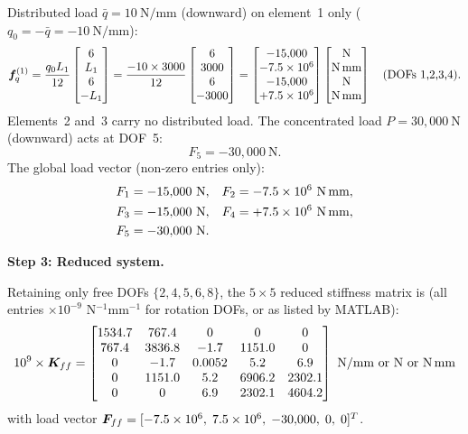 \begin{example}
Distributed load $\bar{q} = 10\ \text{N/mm}$ (downward) on element~1 only
($q_0 = -\bar{q} = -10\ \text{N/mm}$):
\begin{equation*}
    \bm{f}^{(1)}_q = \frac{q_0 L_1}{12}
    \begin{bmatrix} 6 \\ L_1 \\ 6 \\ -L_1 \end{bmatrix}
    = \frac{-10 \times 3000}{12}
    \begin{bmatrix} 6 \\ 3000 \\ 6 \\ -3000 \end{bmatrix}
    =
    \begin{bmatrix} -15{,}000 \\ -7.5 \times 10^6 \\ -15{,}000 \\ +7.5 \times 10^6
    \end{bmatrix}
    \begin{bmatrix} \text{N} \\ \text{N\,mm} \\ \text{N} \\ \text{N\,mm} \end{bmatrix}
    \quad\text{(DOFs 1,2,3,4)} .
\end{equation*}
Elements~2 and~3 carry no distributed load. The concentrated load
$P = 30{,}000\ \text{N}$ (downward) acts at DOF~5:
\[
    F_5 = -30{,}000\ \text{N} .
\]
The global load vector (non-zero entries only):
\begin{align*}
    F_1 &= -15{,}000\ \text{N}, &
    F_2 &= -7.5 \times 10^6\ \text{N\,mm}, \\
    F_3 &= -15{,}000\ \text{N}, &
    F_4 &= +7.5 \times 10^6\ \text{N\,mm}, \\
    F_5 &= -30{,}000\ \text{N}.
\end{align*}

\medskip
\noindent\textbf{Step 3: Reduced system.}

Retaining only free DOFs $\{2,4,5,6,8\}$, the $5\times5$ reduced stiffness
matrix is (all entries $\times 10^{-9}$ N$^{-1}$mm$^{-1}$ for rotation DOFs,
or as listed by MATLAB):
\begin{equation}
    10^9 \times \bm{K}_{ff} =
    \begin{bmatrix}
        1534.7 & 767.4  & 0       & 0       & 0      \\
        767.4  & 3836.8 & -1.7    & 1151.0  & 0      \\
        0      & -1.7   & 0.0052  & 5.2     & 6.9    \\
        0      & 1151.0 & 5.2     & 6906.2  & 2302.1 \\
        0      & 0      & 6.9     & 2302.1  & 4604.2
    \end{bmatrix}\ \text{N/mm or N or N\,mm}
    \label{eq:beam_cont_kff}
\end{equation}
with load vector
$\bm{F}_{ff} = [-7.5\times10^6,\; 7.5\times10^6,\; -30{,}000,\; 0,\; 0]^T$.


\end{example}
